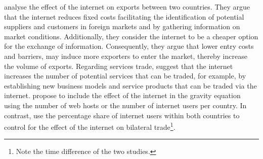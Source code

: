 \textcite{Freund_2004} analyse the effect of the internet on exports between two countries. They argue that the internet reduces fixed costs facilitating the identification of potential suppliers and customers in foreign markets and by gathering information on market conditions. Additionally, they consider the internet to be a cheaper option for the exchange of information. Consequently, they argue that lower entry costs and barriers, may induce more exporters to enter the market, thereby increase the volume of exports. Regarding services trade, \textcite{Freund_2004} suggest that the internet increases the number of potential services that can be traded, for example, by establishing new business models and service products that can be traded via the internet. \textcite{Freund_2004} propose to include the effect of the internet in the gravity equation using the number of web hosts or the number of internet users per country. In contrast, \textcite{DAS2023106246} use the percentage share of internet users within both countries to control for the effect of the internet on bilateral trade\footnote{Note the time difference of the two studies.}.


